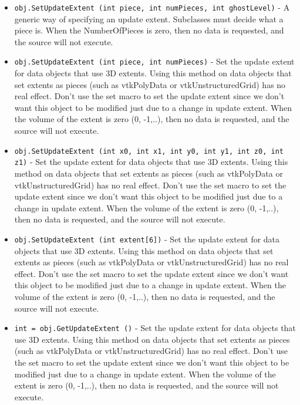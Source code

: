 \begin{itemize}
\item  \verb|obj.SetUpdateExtent (int piece, int numPieces, int ghostLevel)| -  A generic way of specifying an update extent.  Subclasses
 must decide what a piece is.  When the NumberOfPieces is zero, then
 no data is requested, and the source will not execute.

\item  \verb|obj.SetUpdateExtent (int piece, int numPieces)| -  Set the update extent for data objects that use 3D extents. Using this
 method on data objects that set extents as pieces (such as vtkPolyData or
 vtkUnstructuredGrid) has no real effect.
 Don't use the set macro to set the update extent
 since we don't want this object to be modified just due to
 a change in update extent. When the volume of the extent is zero (0, -1,..), 
 then no data is requested, and the source will not execute.

\item  \verb|obj.SetUpdateExtent (int x0, int x1, int y0, int y1, int z0, int z1)| -  Set the update extent for data objects that use 3D extents. Using this
 method on data objects that set extents as pieces (such as vtkPolyData or
 vtkUnstructuredGrid) has no real effect.
 Don't use the set macro to set the update extent
 since we don't want this object to be modified just due to
 a change in update extent. When the volume of the extent is zero (0, -1,..), 
 then no data is requested, and the source will not execute.

\item  \verb|obj.SetUpdateExtent (int extent[6])| -  Set the update extent for data objects that use 3D extents. Using this
 method on data objects that set extents as pieces (such as vtkPolyData or
 vtkUnstructuredGrid) has no real effect.
 Don't use the set macro to set the update extent
 since we don't want this object to be modified just due to
 a change in update extent. When the volume of the extent is zero (0, -1,..), 
 then no data is requested, and the source will not execute.

\item  \verb|int = obj.GetUpdateExtent ()| -  Set the update extent for data objects that use 3D extents. Using this
 method on data objects that set extents as pieces (such as vtkPolyData or
 vtkUnstructuredGrid) has no real effect.
 Don't use the set macro to set the update extent
 since we don't want this object to be modified just due to
 a change in update extent. When the volume of the extent is zero (0, -1,..), 
 then no data is requested, and the source will not execute.


\end{itemize}
